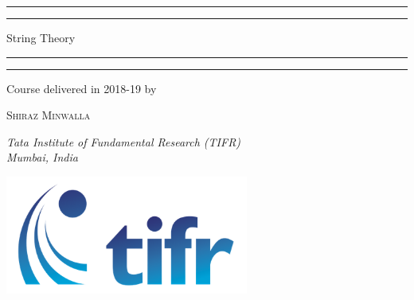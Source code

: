 \documentclass[11pt,oneside]{book}
\theoremstyle{definition} %
\theoremstyle{plain} %
\theoremstyle{remark} %
\theoremstyle{underline}
\begin{document}

\frontmatter

\begin{titlepage}
	\centering
	    \scshape %
        \vspace*{\baselineskip} %
        
	    \rule{\textwidth}{1.6pt}\vspace*{-\baselineskip}\vspace*{2pt} %
	    \rule{\textwidth}{0.4pt} %
	    
	    \vspace{0.75\baselineskip} %
	    
	    {\LARGE String Theory} %
	    
	    \vspace{0.75\baselineskip} %
	    
	    \rule{\textwidth}{0.4pt}\vspace*{-\baselineskip}\vspace{3.2pt} %
	    \rule{\textwidth}{1.6pt} %
	    
        \vspace{5\baselineskip} %

	    Course delivered in 2018-19 by 
	
	    \vspace{0.5\baselineskip} %
	
	    {\scshape\Large Shiraz Minwalla} %
	
	    \vspace{0.5\baselineskip} %
	
	    \textit{Tata Institute of Fundamental Research (TIFR) \\ Mumbai, India } %
	    
	    \vspace{2\baselineskip} %
	    
	    \includegraphics[width=8cm]{images/TataLogo.png}\\[1cm] %


\end{titlepage}
\end{document}

